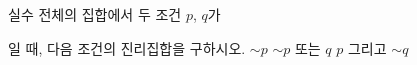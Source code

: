 실수 전체의 집합에서 두 조건 $p$, $q$가 \par\smallskip{}\par\smallskip\noindent 일 때, 다음 조건의 진리집합을 구하시오.
 $\sim p$
 $\sim p$ 또는 $q$
 $p$ 그리고 $\sim q$
